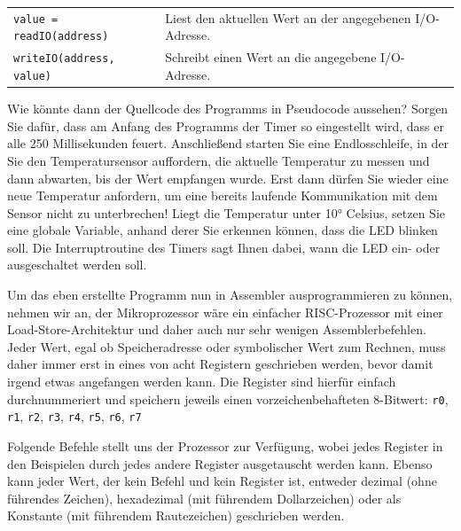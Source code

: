 \bigskip
{
    \setlength{\tabcolsep}{0pt}
    \small

    \begin{tabularx}{\textwidth}{p{}X}
        \texttt{value = readIO(address)}
        &
        Liest den aktuellen Wert an der angegebenen I/O-Adresse.
        \\

        \texttt{writeIO(address, value)}
        &
        Schreibt einen Wert an die angegebene I/O-Adresse.
        \\
    \end{tabularx}
}

Wie könnte dann der Quellcode des Programms in Pseudocode aussehen? Sorgen Sie
dafür, dass am Anfang des Programms der Timer so eingestellt wird, dass er alle
250 Millisekunden feuert. Anschließend starten Sie eine Endlosschleife, in der
Sie den Temperatursensor auffordern, die aktuelle Temperatur zu messen und dann
abwarten, bis der Wert empfangen wurde. Erst dann dürfen Sie wieder eine neue
Temperatur anfordern, um eine bereits laufende Kommunikation mit dem Sensor nicht
zu unterbrechen! Liegt die Temperatur unter 10° Celsius, setzen Sie eine globale
Variable, anhand derer Sie erkennen können, dass die LED blinken soll. Die
Interruptroutine des Timers sagt Ihnen dabei, wann die LED ein- oder ausgeschaltet
werden soll.

\clearpage
\teilaufgabe
Um das eben erstellte Programm nun in Assembler ausprogrammieren zu können,
nehmen wir an, der Mikroprozessor wäre ein einfacher RISC-Prozessor mit einer
Load-Store-Architektur und daher auch nur sehr wenigen Assemblerbefehlen. Jeder
Wert, egal ob Speicheradresse oder symbolischer Wert zum Rechnen, muss daher
immer erst in eines von acht Registern geschrieben werden, bevor damit irgend
etwas angefangen werden kann. Die Register sind hierfür einfach durchnummeriert
und speichern jeweils einen vorzeichenbehafteten 8-Bitwert:
\texttt{r0}, \texttt{r1}, \texttt{r2}, \texttt{r3}, \texttt{r4}, \texttt{r5},
\texttt{r6}, \texttt{r7}

Folgende Befehle stellt uns der Prozessor zur Verfügung, wobei jedes Register
in den Beispielen durch jedes andere Register ausgetauscht werden kann. Ebenso
kann jeder Wert, der kein Befehl und kein Register ist, entweder dezimal (ohne
führendes Zeichen), hexadezimal (mit führendem Dollarzeichen) oder als Konstante
(mit führendem Rautezeichen) geschrieben werden.

